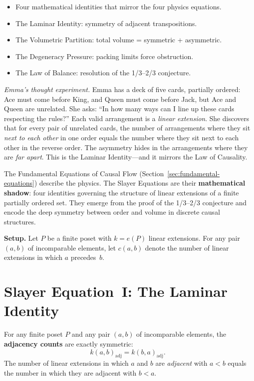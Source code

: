 \documentclass[11pt, a4paper, openany]{book}
\newcounter{thm}[chapter]
\newenvironment{introduction}[1][Modulo Overview]{%
  \begin{tcolorbox}[
    enhanced,colback=structure!5,colframe=structure,
    colbacktitle=structure,coltitle=white,
    fonttitle=\small\bfseries,title={#1},
    arc=2pt,boxrule=0.7pt,
    left=8pt,right=8pt,top=6pt,bottom=6pt,
    before skip=12pt,after skip=12pt
  ]\itshape\begin{itemize}[leftmargin=*,itemsep=2pt,parsep=0pt]
}{%
  \end{itemize}\end{tcolorbox}
}
\begin{document}
\begin{introduction}
  \item Four mathematical identities that mirror the four physics equations.
  \item The Laminar Identity: symmetry of adjacent transpositions.
  \item The Volumetric Partition: total volume = symmetric + asymmetric.
  \item The Degeneracy Pressure: packing limits force obstruction.
  \item The Law of Balance: resolution of the 1/3--2/3 conjecture.
\end{introduction}

\smallskip\noindent
\textit{Emma's thought experiment.}
Emma has a deck of five cards, partially ordered: Ace must come before
King, and Queen must come before Jack, but Ace and Queen are unrelated.
She asks: ``In how many ways can I line up these cards respecting the
rules?'' Each valid arrangement is a \emph{linear extension}. She
discovers that for every pair of unrelated cards, the number of
arrangements where they sit \emph{next to each other} in one order equals
the number where they sit next to each other in the reverse order. The
asymmetry hides in the arrangements where they are \emph{far apart}.
This is the Laminar Identity---and it mirrors the Law of Causality.
\smallskip

\noindent
The Fundamental Equations of Causal Flow
(Section~\ref{sec:fundamental-equations}) describe the physics. The
Slayer Equations are their \textbf{mathematical shadow}: four identities
governing the structure of linear extensions of a finite partially
ordered set. They emerge from the proof of the 1/3--2/3 conjecture and
encode the deep symmetry between order and volume in discrete causal
structures.

\medskip\noindent
\textbf{Setup.} Let $P$ be a finite poset with $k = e(P)$ linear
extensions. For any pair $(a, b)$ of incomparable elements, let $c(a,b)$
denote the number of linear extensions in which $a$ precedes~$b$.

\section{Slayer Equation~I: The Laminar Identity}

\begin{theorem}\label{thm:laminar-identity}
For any finite poset $P$ and any pair $(a, b)$ of incomparable elements,
the \textbf{adjacency counts} are exactly symmetric:
\begin{equation}\label{eq:laminar-identity}
  k(a,b)_{\mathrm{adj}} = k(b,a)_{\mathrm{adj}}.
\end{equation}
The number of linear extensions in which $a$ and $b$ are \emph{adjacent}
with $a < b$ equals the number in which they are adjacent with $b < a$.
\end{theorem}
\end{document}
